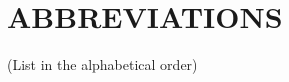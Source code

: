 \section*{\centering ABBREVIATIONS}
\begin{center}
    (List in the alphabetical order)
\end{center}{}
\printglossary[type=\acronymtype]

